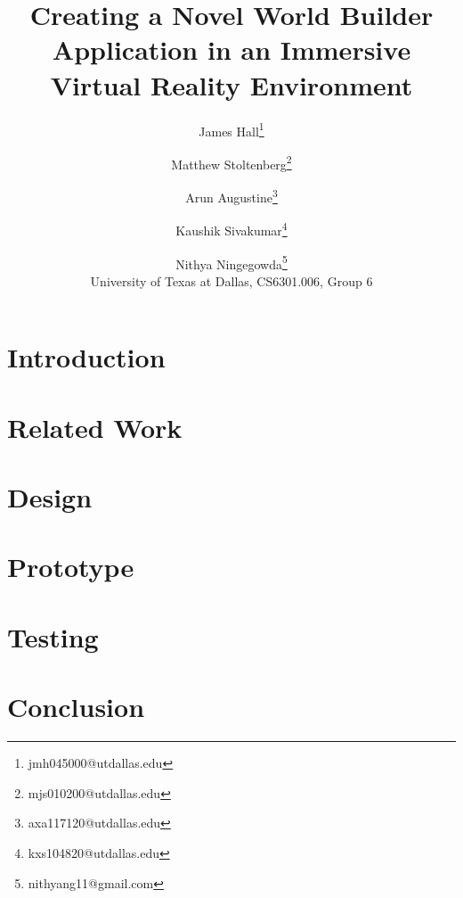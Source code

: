 \documentclass{vgtc}
\title{Creating a Novel World Builder Application in an Immersive Virtual Reality Environment}
\author{James Hall\thanks{jmh045000@utdallas.edu}
\and Matthew Stoltenberg\thanks{mjs010200@utdallas.edu}
\and Arun Augustine\thanks{axa117120@utdallas.edu}
\and Kaushik Sivakumar\thanks{kxs104820@utdallas.edu}
\and Nithya Ningegowda\thanks{nithyang11@gmail.com}
\\ \scriptsize University of Texas at Dallas, CS6301.006, Group 6}
\begin{document}
\maketitle

\section{Introduction}


\section{Related Work}


\section{Design}


\section{Prototype}


\section{Testing}


\section{Conclusion}




\end{document}
